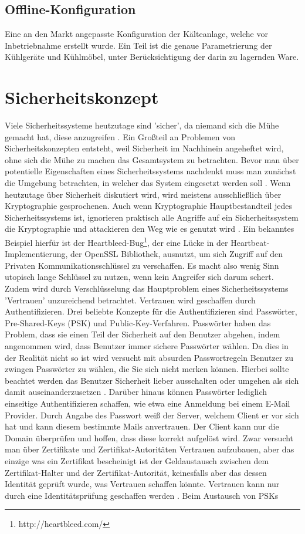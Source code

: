 \documentclass[11pt,a4paper]{report}
\begin{document}
\subsection{Offline-Konfiguration} Eine an den Markt angepasste Konfiguration der Kälteanlage, welche vor Inbetriebnahme erstellt wurde. Ein Teil ist die genaue Parametrierung der Kühlgeräte und Kühlmöbel, unter Berücksichtigung der darin zu lagernden Ware.

\section{Sicherheitskonzept}

Viele Sicherheitssysteme heutzutage sind 'sicher', da niemand sich die Mühe gemacht hat, diese anzugreifen \cite{gutmann0}. Ein Großteil an Problemen von Sicherheitskonzepten entsteht, weil Sicherheit im Nachhinein angeheftet wird, ohne sich die Mühe zu machen das Gesamtsystem zu betrachten. Bevor man über potentielle Eigenschaften eines Sicherheitssystems nachdenkt muss man zunächst die Umgebung betrachten, in welcher das System eingesetzt werden soll \cite{gutmann4}. Wenn heutzutage über Sicherheit diskutiert wird, wird meistens ausschließlich über Kryptographie gesprochenen. Auch wenn Kryptographie Hauptbestandteil jedes Sicherheitssystems ist, ignorieren praktisch alle Angriffe auf ein Sicherheitssystem die Kryptographie und attackieren den Weg wie es genutzt wird \cite{gutmann1}. Ein bekanntes Beispiel hierfür ist der Heartbleed-Bug\footnote{http://heartbleed.com/}, der eine Lücke in der Heartbeat-Implementierung, der OpenSSL Bibliothek, ausnutzt, um sich Zugriff auf den Privaten Kommunikationsschlüssel zu verschaffen. Es macht also wenig Sinn utopisch lange Schlüssel zu nutzen, wenn kein Angreifer sich darum schert. Zudem wird durch Verschlüsselung das Hauptproblem eines Sicherheitssystems 'Vertrauen' unzureichend betrachtet. Vertrauen wird geschaffen durch Authentifizieren. Drei beliebte Konzepte für die Authentifizieren sind Passwörter, Pre-Shared-Keys (PSK) und Public-Key-Verfahren. Passwörter haben das Problem, dass sie einen Teil der Sicherheit auf den Benutzer abgehen, indem angenommen wird, dass Benutzer immer sichere Passwörter wählen. Da dies in der Realität nicht so ist wird versucht mit absurden Passwortregeln Benutzer zu zwingen Passwörter zu wählen, die Sie sich nicht merken können. Hierbei sollte beachtet werden das Benutzer Sicherheit lieber ausschalten oder umgehen als sich damit auseinanderzusetzen \cite{gutmann5}. Darüber hinaus können Passwörter lediglich einseitige Authentifizieren schaffen, wie etwa eine Anmeldung bei einem E-Mail Provider. Durch Angabe des Passwort weiß der Server, welchem Client er vor sich hat und kann diesem bestimmte Mails anvertrauen. Der Client kann nur die Domain überprüfen und hoffen, dass diese korrekt aufgelöst wird. Zwar versucht man über Zertifikate und Zertifikat-Autoritäten Vertrauen aufzubauen, aber das einzige was ein Zertifikat bescheinigt ist der Geldaustausch zwischen dem Zertifikat-Halter und der Zertifikat-Autorität, keinesfalls aber das dessen Identität geprüft wurde, was Vertrauen schaffen könnte. Vertrauen kann nur durch eine Identitätsprüfung geschaffen werden \cite{gutmann8}. Beim Austausch von PSKs 
\end{document}
